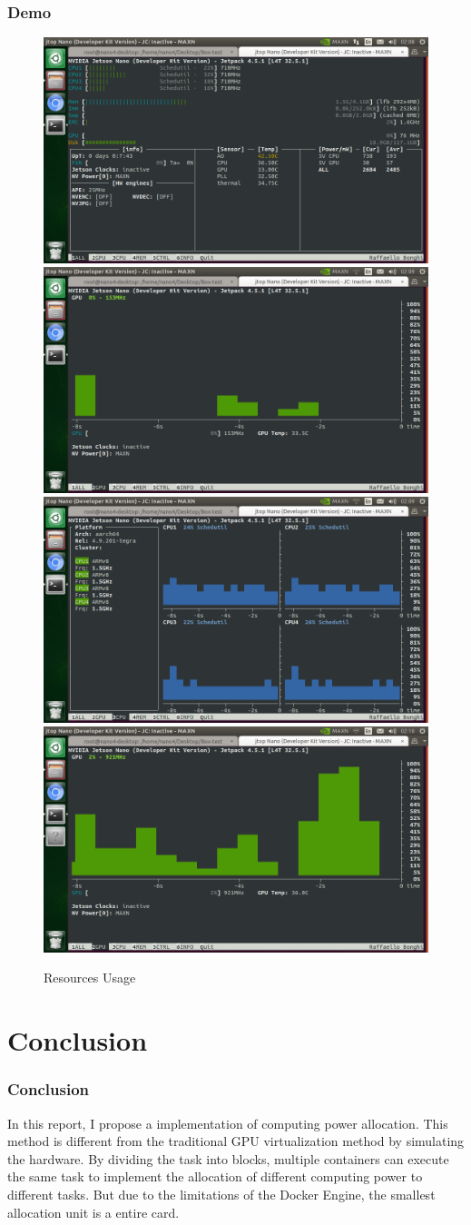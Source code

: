 \documentclass{beamer}
\begin{document}
\begin{frame}
    \frametitle{Demo} 
    \begin{figure}[H]
        \centering
        \includegraphics[width=.4\textwidth]{img/report7.png}
        \includegraphics[width=.4\textwidth]{img/report8.png}
        \includegraphics[width=.4\textwidth]{img/report9.png}
        \includegraphics[width=.4\textwidth]{img/report10.png}
        \caption{Resources Usage}
        \label{img6}
    \end{figure}
\end{frame}
\section{Conclusion}
\begin{frame}
    \frametitle{Conclusion} 
    In this report, I propose a implementation of computing power allocation. This method is different from the traditional GPU virtualization method by simulating the hardware. By dividing the task into blocks, multiple containers can execute the same task to implement the allocation of different computing power to different tasks. But due to the limitations of the Docker Engine, the smallest allocation unit is a entire card.
\end{frame}
\end{document}
